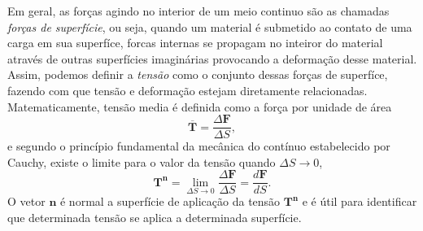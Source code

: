 Em geral, as for\c{c}as agindo no interior de um meio continuo s\~ao as chamadas \textit{for\c{c}as de superf\'icie}, ou seja, quando um material \'e submetido ao contato de uma carga em sua superf\'ice, forcas internas se propagam no inteiror do material atrav\'es de outras superf\'icies imagin\'arias provocando a deforma\c{c}\~ao desse material. Assim, podemos definir a \textit{tens\~ao} como o conjunto dessas for\c{c}as de superf\'ice, fazendo com que tens\~ao e deforma\c{c}\~ao estejam diretamente relacionadas. Matematicamente, tens\~ao media \'e definida como a for\c{c}a por unidade de \'area
\begin{equation}\label{eq.tensao_media}
\mathbf{\overline{T}}=\frac{\Delta\mathbf{F}}{\Delta S},
\end{equation}
e segundo o princ\'ipio fundamental da mec\^anica do cont\'inuo estabelecido por Cauchy, existe o limite para o valor da tens\~ao quando $\Delta S\to 0$,
\begin{equation*}
\mathbf{T}^{\mathbf{n}}=\lim_{\Delta S\to 0}\frac{\Delta\mathbf{F}}{\Delta S}=\frac{d\mathbf{F}}{dS}.
\end{equation*}
O vetor $\mathbf{n}$ \'e normal a superf\'icie de aplica\c{c}\~ao da tens\~ao $\mathbf{T}^{\mathbf{n}}$ e \'e \'util para identificar que determinada tens\~ao se aplica a determinada superf\'icie.

